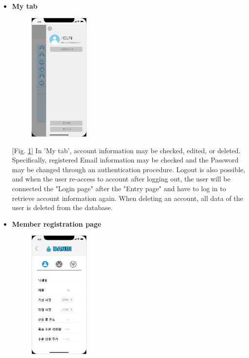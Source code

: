 \documentclass[conference]{IEEEtran}
\begin{document}
\begin{itemize}
[Fig. \ref{fig:main}] In 'Main page', the user can see a list of members registered in account. In DANBI, humans, pets, and plants can be registered as family members. The member's nickname is provided in the form of a list along with an icon representing each object, and when each nickname is clicked, the member's detailed screen page is accessed. There is a '+' button below the member list. When the button is clicked, application is automatically connected to the 'Member Registration page' where user can add members.

\item \textbf{My tab}

\par \begin{figure}[h!]
\includegraphics[width=3cm]{xd/my tab.JPG}
\centering
\caption{}
\label{fig:mytab}
\end{figure}

[Fig. \ref{fig:mytab}] In 'My tab', account information may be checked, edited, or deleted. Specifically, registered Email information may be checked and the Password may be changed through an authentication procedure. Logout is also possible, and when the user re-access to account after logging out, the user will be connected the "Login page" after the "Entry page" and have to log in to retrieve account information again. When deleting an account, all data of the user is deleted from the database.


\item \textbf{Member registration page}

\par \begin{figure}[h!]
\includegraphics[width=3cm]{xd/member registration page.JPG}
\centering
\caption{}
\label{fig:registration}
\end{figure}


\end{itemize}
\end{document}
